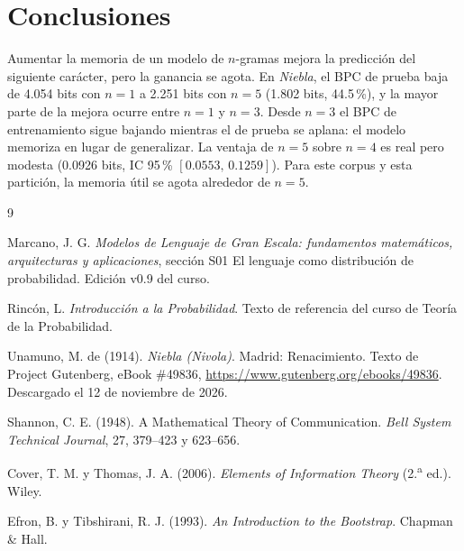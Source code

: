 \documentclass[11pt,letterpaper]{article}
\begin{document}
\section{Conclusiones}\label{sec:conclusiones}

Aumentar la memoria de un modelo de $n$-gramas mejora la predicción del siguiente carácter, pero la ganancia se agota. En \emph{Niebla}, el BPC de prueba baja de 4.054 bits con $n=1$ a 2.251 bits con $n=5$ (1.802 bits, 44.5\,\%), y la mayor parte de la mejora ocurre entre $n=1$ y $n=3$. Desde $n=3$ el BPC de entrenamiento sigue bajando mientras el de prueba se aplana: el modelo memoriza en lugar de generalizar. La ventaja de $n=5$ sobre $n=4$ es real pero modesta (0.0926 bits, IC 95\,\% $[0.0553,\,0.1259]$). Para este corpus y esta partición, la memoria útil se agota alrededor de $n=5$.

\renewcommand{\refname}{Referencias}
\begin{thebibliography}{9}
\footnotesize
\setlength{\itemsep}{0pt}

Marcano, J. G. \emph{Modelos de Lenguaje de Gran Escala: fundamentos matemáticos, arquitecturas y aplicaciones}, sección S01 \guillemotleft{}El lenguaje como distribución de probabilidad\guillemotright{}. Edición v0.9 del curso.

Rincón, L. \emph{Introducción a la Probabilidad}. Texto de referencia del curso de Teoría de la Probabilidad.

Unamuno, M. de (1914). \emph{Niebla (Nivola)}. Madrid: Renacimiento. Texto de Project Gutenberg, eBook \#49836, \url{https://www.gutenberg.org/ebooks/49836}. Descargado el 12 de noviembre de 2026.

Shannon, C. E. (1948). A Mathematical Theory of Communication. \emph{Bell System Technical Journal}, 27, 379--423 y 623--656.

Cover, T. M. y Thomas, J. A. (2006). \emph{Elements of Information Theory} (2.\textsuperscript{a} ed.). Wiley.

Efron, B. y Tibshirani, R. J. (1993). \emph{An Introduction to the Bootstrap}. Chapman \& Hall.

\end{thebibliography}
\end{document}
